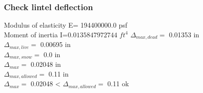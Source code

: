 \subsubsection{Check lintel deflection}
Modulus of elasticity E=  194400000.0  psf \\
Moment of inertia I=$  0.0135847972744$  $ft^4 $
$\Delta_{max,dead} =$  0.01353  in \\
$\Delta_{max,live} =$  0.00695  in \\
$\Delta_{max,snow} =$  0.0  in \\
$\Delta_{max} =$  0.02048  in \\
$\Delta_{max,allowed} =$  0.11  in \\
$\Delta_{max} =$  0.02048  < $\Delta_{max,allowed} =$  0.11  ok \\
